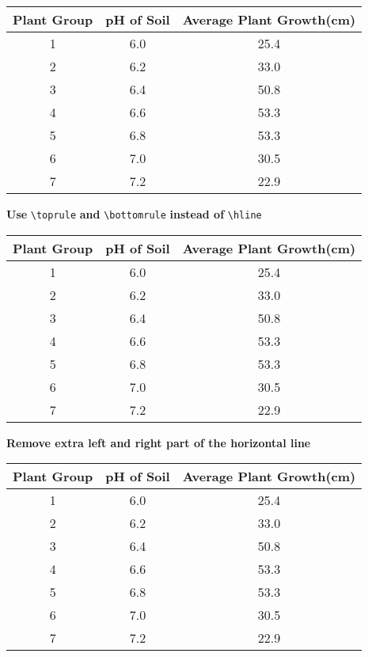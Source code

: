 \documentclass[a4paper,12pt]{article}
\begin{document}
\begin{tabular}{ccc}
\hline
Plant Group & pH of Soil & Average Plant Growth(cm)\\
\hline
1 & 6.0 & 25.4\\
2 & 6.2 & 33.0\\
3 & 6.4 & 50.8\\
4 & 6.6 & 53.3\\
5 & 6.8 & 53.3\\
6 & 7.0 & 30.5\\
7 & 7.2 & 22.9\\
\hline
\end{tabular}
\textbf{Use} \verb|\toprule| \textbf{and} \verb|\bottomrule| \textbf{instead of} \verb|\hline|

\begin{tabular}{ccc}
\toprule
Plant Group & pH of Soil & Average Plant Growth(cm)\\
\toprule
1 & 6.0 & 25.4\\
2 & 6.2 & 33.0\\
3 & 6.4 & 50.8\\
4 & 6.6 & 53.3\\
5 & 6.8 & 53.3\\
6 & 7.0 & 30.5\\
7 & 7.2 & 22.9\\
\bottomrule
\end{tabular}
\textbf{Remove extra left and right part of the horizontal line}

\begin{tabular}{@{}ccc@{}}
\toprule
Plant Group & pH of Soil & Average Plant Growth(cm)\\
\toprule
1 & 6.0 & 25.4\\
2 & 6.2 & 33.0\\
3 & 6.4 & 50.8\\
4 & 6.6 & 53.3\\
5 & 6.8 & 53.3\\
6 & 7.0 & 30.5\\
7 & 7.2 & 22.9\\
\bottomrule
\end{tabular}
\end{document}
